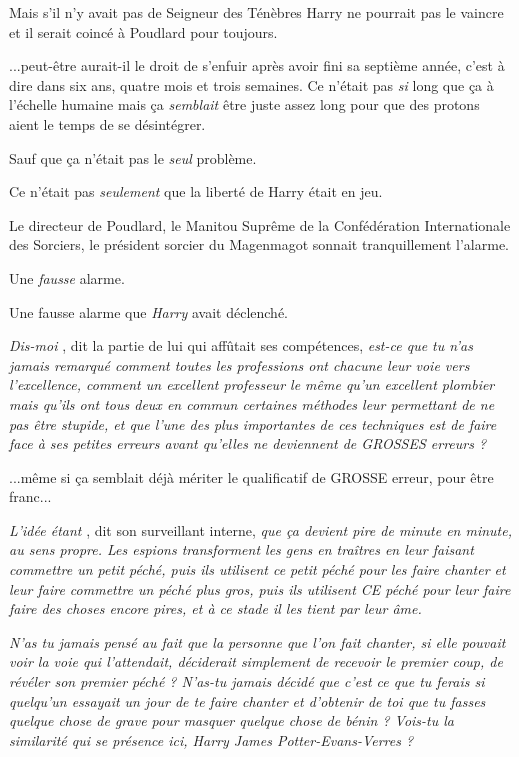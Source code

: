 Mais s'il n'y avait pas de Seigneur des Ténèbres Harry ne pourrait pas le vaincre et il serait coincé à Poudlard pour toujours.

...peut-être aurait-il le droit de s'enfuir après avoir fini sa septième année, c'est à dire dans six ans, quatre mois et trois semaines. Ce n'était pas \emph{si}  long que ça à l'échelle humaine mais ça \emph{semblait}  être juste assez long pour que des protons aient le temps de se désintégrer.

Sauf que ça n'était pas le \emph{seul}  problème.

Ce n'était pas \emph{seulement}  que la liberté de Harry était en jeu.

Le directeur de Poudlard, le Manitou Suprême de la Confédération Internationale des Sorciers, le président sorcier du Magenmagot sonnait tranquillement l'alarme.

Une \emph{fausse}  alarme.

Une fausse alarme que \emph{Harry}  avait déclenché.

\emph{Dis-moi} , dit la partie de lui qui affûtait ses compétences, \emph{est-ce que tu n'as jamais remarqué comment toutes les professions ont chacune leur voie vers l'excellence, comment un excellent professeur le même qu'un excellent plombier mais qu'ils ont tous deux en commun certaines méthodes leur permettant de ne pas être stupide, et que l'une des plus importantes de ces techniques est de faire face à ses petites erreurs avant qu'elles ne deviennent de GROSSES erreurs ?} 

...même si ça semblait déjà mériter le qualificatif de GROSSE erreur, pour être franc...

\emph{L'idée étant} , dit son surveillant interne, \emph{que ça devient pire de minute en minute, au sens propre. Les espions transforment les gens en traîtres en leur faisant commettre un petit péché, puis ils utilisent ce petit péché pour les faire chanter et leur faire commettre un péché plus gros, puis ils utilisent CE péché pour leur faire faire des choses encore pires, et à ce stade il les tient par leur âme.} 

\emph{N'as tu jamais pensé au fait que la personne que l'on fait chanter, si elle pouvait voir la voie qui l'attendait, déciderait simplement de recevoir le premier coup, de révéler son premier péché ? N'as-tu jamais décidé que c'est ce que tu ferais si quelqu'un essayait un jour de te faire chanter et d'obtenir de toi que tu fasses quelque chose de grave pour masquer quelque chose de bénin ? Vois-tu la similarité qui se présence ici, Harry James Potter-Evans-Verres ?} 

